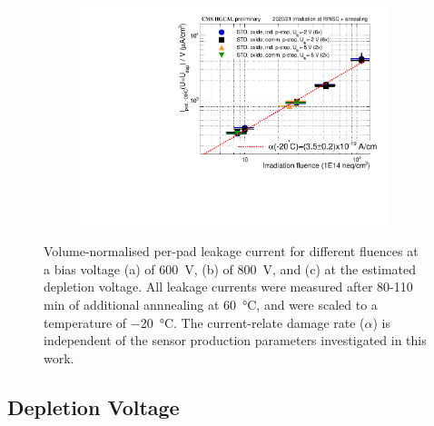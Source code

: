 \begin{figure}
\begin{subfigure}[b]{0.32\textwidth}
		\includegraphics[width=0.99\textwidth]{plots/alpha/alpha_Udep.pdf}
		\subcaption{
			}
			\label{plot:alpha_Udep}
	\end{subfigure}
	\hfill		
	\caption{
	    Volume-normalised per-pad leakage current for different fluences at a bias voltage (a) of \SI{600}{\volt}, (b) of \SI{800}{\volt}, and (c) at the estimated depletion voltage.
		All leakage currents were measured after 80-110$~$min of additional annnealing at \SI{60}{\celsius}, and were scaled to a temperature of \SI{-20}{\celsius}.
        The current-relate damage rate ($\alpha$) is independent of the sensor production parameters investigated in this work.
	}
\end{figure}

\subsection{Depletion Voltage}


